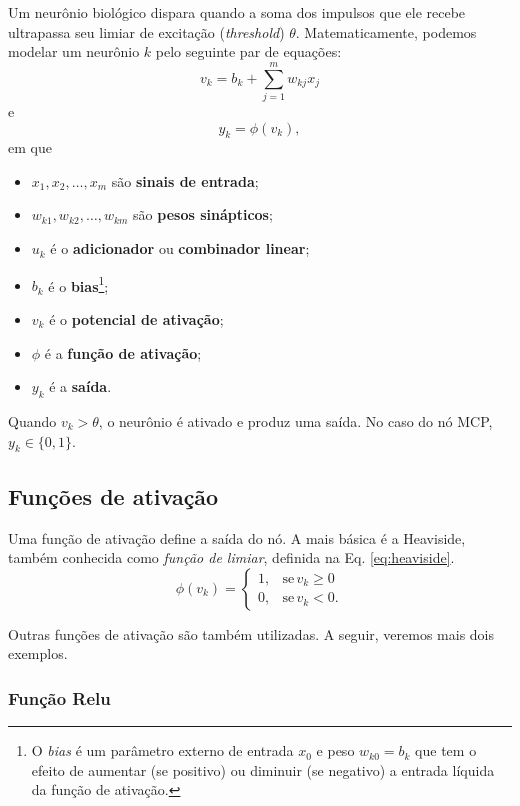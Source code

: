 \documentclass[10pt,journal,compsoc]{IEEEtran}
\begin{document}
Um neurônio biológico dispara quando a soma dos impulsos que ele recebe 
ultrapassa seu limiar de excitação (\textit{threshold}) $\theta$. 
Matematicamente, podemos modelar um neurônio $k$ pelo seguinte par de equações: 
\begin{equation}
    v_k = b_k + \displaystyle \sum_{j=1}^m w_{kj} x_j 
\end{equation}
e
\begin{equation}
    y_k = \phi(v_k),
\end{equation}
em que
\begin{itemize}
    \item $x_1,x_2,\ldots,x_m$ são \textbf{sinais de entrada};
    \item $w_{k1},w_{k2},\ldots,w_{km}$ são \textbf{pesos sinápticos};
    \item $u_k$ é o \textbf{adicionador} ou \textbf{combinador linear}; 
    \item $b_k$ é o \textbf{bias}\footnote{O \textit{bias} é um parâmetro externo 
    de entrada $x_0$ e peso $w_{k0} = b_k$ que tem o efeito de aumentar (se positivo) 
    ou diminuir (se negativo) a entrada líquida da função de ativação.};
    \item $v_k$ é o \textbf{potencial de ativação};
    \item $\phi$ é a \textbf{função de ativação};
    \item $y_k$ é a \textbf{saída}.
\end{itemize}
Quando $v_k > \theta$, o neurônio é ativado e produz uma saída. No caso do nó MCP, $y_k \in \{0,1\}$. 

\subsection{Funções de ativação}

Uma função de ativação define a saída do nó. A mais básica é a Heaviside, 
também conhecida como \textit{função de limiar}, definida na Eq. \eqref{eq:heaviside}.
\begin{equation}
\label{eq:heaviside}
\phi(v_k) = 
\begin{cases}
1, & \text{se} \, v_k \geq 0 \\
0, & \text{se} \, v_k < 0.
\end{cases}
\end{equation}

Outras funções de ativação são também utilizadas. A seguir, veremos mais dois exemplos.

\subsubsection{Função Relu}
\end{document}
